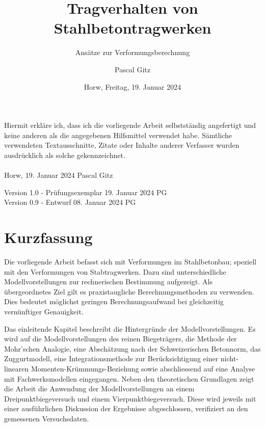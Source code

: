 \documentclass[
  12pt,
  letterpaper,
  egregdoesnotlikesansseriftitles]{scrreprt}
\title{Tragverhalten von Stahlbetontragwerken}
\subtitle
{Ansätze zur Verformungsberechnung}
\date{\large Horw, Freitag, 19. Januar 2024}
\author{Pascal Gitz}
\begin{document}
\maketitle

Hiermit erkläre ich, dass ich die vorliegende Arbeit selbstständig angefertigt und keine anderen als die angegebenen Hilfsmittel verwendet habe. Sämtliche verwendeten Textausschnitte, Zitate oder Inhalte anderer Verfasser wurden ausdrücklich als solche gekennzeichnet.\\%
%
\\%
%
Horw, 19. Januar 2024 \hfill Pascal Gitz%

\vfill

Version 1.0 - Prüfungsexemplar \hfill 19. Januar 2024 \quad \quad \quad \quad \quad PG\\
Version 0.9 - Entwurf \hfill 08. Januar 2024 \quad \quad \quad \quad \quad PG\\

\newpage

\chapter*{Kurzfassung}

Die vorliegende Arbeit befasst sich mit Verformungen im Stahlbetonbau; speziell mit den Verformungen von Stabtragwerken. Dazu sind unterschiedliche Modellvorstellungen zur rechnerischen Bestimmung aufgezeigt. Als übergeordnetes Ziel gilt es praxistaugliche Berechnungsmethoden zu verwenden. Dies bedeutet möglichst geringen Berechnungsaufwand bei gleichzeitig vernünftiger Genauigkeit.  

Das einleitende Kapitel beschreibt die Hintergründe der Modellvorstellungen. Es wird auf die Modellvorstellungen des reinen Biegeträgers, die Methode der Mohr'schen Analogie, eine Abschätzung nach der Schweizerischen Betonnorm, das Zuggurtmodell, eine Integrationsmethode zur Berücksichtigung einer nicht-linearen Momenten-Krümmungs-Beziehung sowie abschliessend auf eine Analyse mit Fachwerksmodellen eingegangen. Neben den theoretischen Grundlagen zeigt die Arbeit die Anwendung der Modellvorstellungen an einem Dreipunktbiegeversuch und einem Vierpunktbiegeversuch. Diese wird jeweils mit einer ausführlichen Diskussion der Ergebnisse abgeschlossen, verifiziert an den gemessenen Versuchsdaten. 
\end{document}
